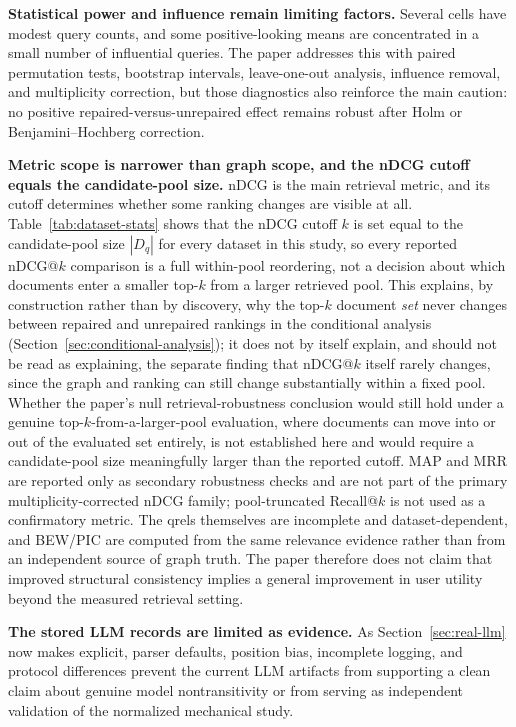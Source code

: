 \documentclass[manuscript,anonymous,review]{acmart}
\begin{document}
\textbf{Statistical power and influence remain limiting factors.} Several cells
have modest query counts, and some positive-looking means are concentrated in a
small number of influential queries. The paper addresses this with paired
permutation tests, bootstrap intervals, leave-one-out analysis, influence
removal, and multiplicity correction, but those diagnostics also reinforce the
main caution: no positive repaired-versus-unrepaired effect remains robust after
Holm or Benjamini--Hochberg correction.

\textbf{Metric scope is narrower than graph scope, and the nDCG cutoff
equals the candidate-pool size.} nDCG is the main retrieval metric, and its
cutoff determines whether some ranking changes are visible at all. Table~\ref{tab:dataset-stats}
shows that the nDCG cutoff $k$ is set equal to the candidate-pool size
$|D_q|$ for every dataset in this study, so every reported nDCG@$k$
comparison is a full within-pool reordering, not a decision about which
documents enter a smaller top-$k$ from a larger retrieved pool. This
explains, by construction rather than by discovery, why the top-$k$
document \emph{set} never changes between repaired and unrepaired rankings
in the conditional analysis (Section~\ref{sec:conditional-analysis}); it
does not by itself explain, and should not be read as explaining, the
separate finding that nDCG@$k$ itself rarely changes, since the graph and
ranking can still change substantially within a fixed pool. Whether the
paper's null retrieval-robustness conclusion would still hold under a
genuine top-$k$-from-a-larger-pool evaluation, where documents can move
into or out of the evaluated set entirely, is not established here and
would require a candidate-pool size meaningfully larger than the reported
cutoff. MAP and MRR are reported only as secondary robustness checks and are not
part of the primary multiplicity-corrected nDCG family; pool-truncated
Recall@$k$ is not used as a confirmatory metric. The qrels themselves are
incomplete and dataset-dependent, and BEW/PIC are computed from the same
relevance evidence rather than from an independent source of graph truth. The
paper therefore does not claim that improved structural consistency implies a
general improvement in user utility beyond the measured retrieval setting.

\textbf{The stored LLM records are limited as evidence.} As Section~\ref{sec:real-llm}
now makes explicit, parser defaults, position bias, incomplete logging, and
protocol differences prevent the current LLM artifacts from supporting a clean
claim about genuine model nontransitivity or from serving as independent
validation of the normalized mechanical study.
\end{document}
